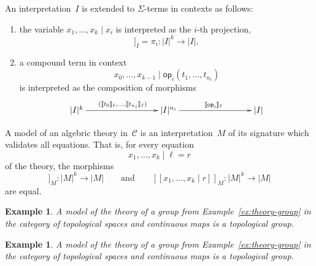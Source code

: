 \documentclass{amsart}
\newcommand{\CC}{\mathcal{C}}
\newcommand{\op}{\mathsf{op}}
\newcommand{\sem}[1]{[\![#1]\!]}
\newtheorem{example}[definition]{Example}
\begin{document}
An interpretation~$I$ is extended to $\Sigma$-terms in contexts as follows:
%
\begin{enumerate}
\item the variable $x_1, \ldots, x_k \mid x_i$ is interpreted as the $i$-th projection,
  \begin{equation*}
    \sem{x_0, \ldots, x_{k-1} \mid  x_i}_I = \pi_i : |I|^k \to |I|,
  \end{equation*}
\item a compound term in context
  \begin{equation*}
    x_0, \ldots, x_{k-1} \mid \op_i(t_1, \ldots, t_{n_i})
  \end{equation*}
  is interpreted as the composition of morphisms
  \begin{equation*}
    \xymatrix@+6em{
      {|I|^k} \ar[r]^{(\sem{t_0}_I, \ldots, \sem{t_{n_i}}_I)}
      &
      {|I|^{n_i}} \ar[r]^{\sem{\op_i}_I}
      &
      {|I|}
    }
  \end{equation*}
\end{enumerate}
%
A model of an algebric theory in~$\CC$ is an interpretation~$M$ of its signature which
validates all equations. That is, for every equation
%
\begin{equation*}
  x_1, \ldots, x_k \mid \ell = r
\end{equation*}
%
of the theory, the morphisms
%
\begin{equation*}
  \sem{x_1, \ldots, x_k \mid \ell}_M : |M|^k \to |M|
  \qquad\text{and}\qquad
  \sem{x_1, \ldots, x_k \mid r}_M : |M|^k \to |M|
\end{equation*}
%
are equal.

\begin{example}
  A model of the theory of a group from Example~\ref{ex:theory-group} in the category of
  topological spaces and continuous maps is a topological group.
\end{example}

\begin{example}
  A model of the theory of a group from Example~\ref{ex:theory-group} in the category of
  topological spaces and continuous maps is a topological group.
\end{example}
\end{document}
